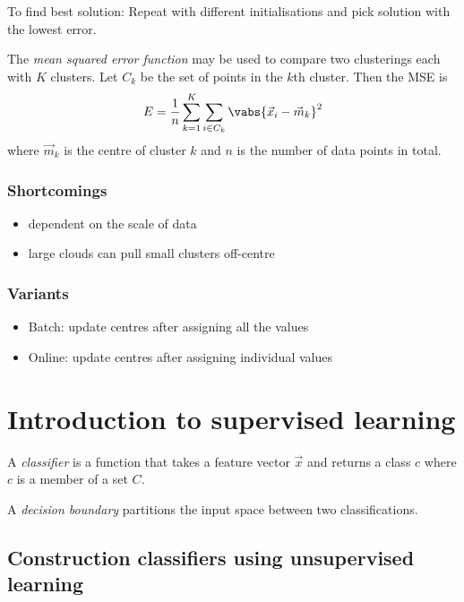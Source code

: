 \documentclass{article}
\begin{document}
To find best solution: Repeat with different initialisations and pick solution
with the lowest error.
\begin{definition}
	The \emph{mean squared error function} may be used to compare two clusterings
	each with $K$ clusters. Let $C_k$ be the set of points in the $k$th cluster.
	Then the MSE is
	\begin{align*}
		E = \frac{1}{n}\sum_{k=1}^K \sum_{i\in C_k} \vabs{\vec x_i - \vec m_k}^2
	\end{align*}
	where $\vec m_k$ is the centre of cluster $k$ and $n$ is the number of data
	points in total.
\end{definition}

\subsubsection{Shortcomings}

\begin{itemize}
	\item dependent on the scale of data
	\item large clouds can pull small clusters off-centre
\end{itemize}

\subsubsection{Variants}

\begin{itemize}
	\item Batch: update centres after assigning all the values
	\item Online: update centres after assigning individual values
\end{itemize}


\section{Introduction to supervised learning}


\begin{definition}
	A \emph{classifier} is a function that takes a feature vector $\vec x$
	and returns a class $c$ where $c$ is a member of a set $C$.
\end{definition}
\begin{definition}
	A \emph{decision boundary} partitions the input space between two
	classifications.
\end{definition}

\subsection{Construction classifiers using unsupervised learning}
\end{document}
